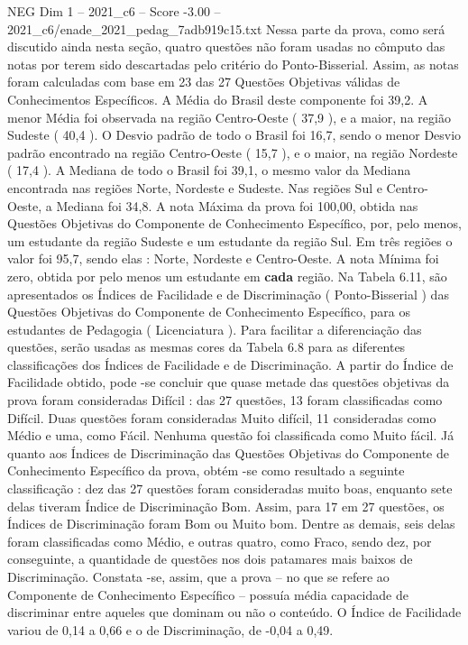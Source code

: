 \begin{textsample}{NEG Dim 1 – 2021\_c6 – Score -3.00 – 2021\_c6/enade\_2021\_pedag\_7adb919c15.txt}
Nessa parte da prova, como será discutido ainda nesta seção, quatro questões não foram usadas no cômputo das notas por terem sido descartadas pelo critério do Ponto-Bisserial.
Assim, as notas foram calculadas com base em 23 das 27 Questões Objetivas válidas de Conhecimentos Específicos.
A Média do Brasil deste componente foi 39,2.
A menor Média foi observada na região Centro-Oeste ( 37,9 ), e a maior, na região Sudeste ( 40,4 ).
O Desvio padrão de todo o Brasil foi 16,7, sendo o menor Desvio padrão encontrado na região Centro-Oeste ( 15,7 ), e o maior, na região Nordeste ( 17,4 ).
A Mediana de todo o Brasil foi 39,1, o mesmo valor da Mediana encontrada nas regiões Norte, Nordeste e Sudeste.
Nas regiões Sul e Centro-Oeste, a Mediana foi 34,8.
A nota Máxima da prova foi 100,00, obtida nas Questões Objetivas do Componente de Conhecimento Específico, por, pelo menos, um estudante da região Sudeste e um estudante da região Sul.
Em três regiões o valor foi 95,7, sendo elas : Norte, Nordeste e Centro-Oeste.
A nota Mínima foi zero, obtida por pelo menos um estudante em \textbf{cada} região.
Na Tabela 6.11, são apresentados os Índices de Facilidade e de Discriminação ( Ponto-Bisserial ) das Questões Objetivas do Componente de Conhecimento Específico, para os estudantes de Pedagogia ( Licenciatura ).
Para facilitar a diferenciação das questões, serão usadas as mesmas cores da Tabela 6.8 para as diferentes classificações dos Índices de Facilidade e de Discriminação.
A partir do Índice de Facilidade obtido, pode -se concluir que quase metade das questões objetivas da prova foram consideradas Difícil : das 27 questões, 13 foram classificadas como Difícil.
Duas questões foram consideradas Muito difícil, 11 consideradas como Médio e uma, como Fácil.
Nenhuma questão foi classificada como Muito fácil.
Já quanto aos Índices de Discriminação das Questões Objetivas do Componente de Conhecimento Específico da prova, obtém -se como resultado a seguinte classificação : dez das 27 questões foram consideradas muito boas, enquanto sete delas tiveram Índice de Discriminação Bom.
Assim, para 17 em 27 questões, os Índices de Discriminação foram Bom ou Muito bom.
Dentre as demais, seis delas foram classificadas como Médio, e outras quatro, como Fraco, sendo dez, por conseguinte, a quantidade de questões nos dois patamares mais baixos de Discriminação.
Constata -se, assim, que a prova – no que se refere ao Componente de Conhecimento Específico – possuía média capacidade de discriminar entre aqueles que dominam ou não o conteúdo.
O Índice de Facilidade variou de 0,14 a 0,66 e o de Discriminação, de -0,04 a 0,49.

\end{textsample}
